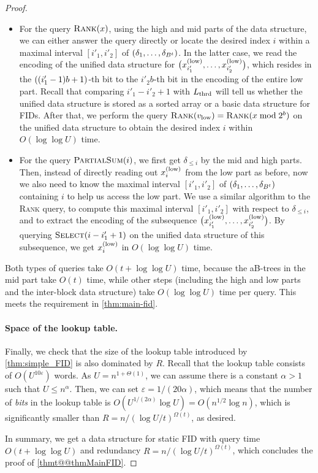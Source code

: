 \documentclass{article}
\theoremstyle{plain}
\theoremstyle{definition}  \newtheorem{definition}[theorem]{Definition}
\DeclarePairedDelimiter{\bk}{(}{)}
\newcommand{\eps}{\varepsilon}
\newcommand{\xlow}[1][i]{x_{#1}^{(\textup{low})}}
\newcommand{\rank}{\textup{\textsc{Rank}}\xspace}
\newcommand{\select}{\textup{\textsc{Select}}\xspace}
\newcommand{\partialsum}{\textup{\textsc{PartialSum}}\xspace}
\newcommand{\Lthrd}{L_{\textup{thrd}}}
\newcommand{\vlow}{v_{\textup{low}}}
\begin{document}
\begin{proof}
\begin{itemize}
\item For the query $\rank(x)$, using the high and mid parts of the data structure, we can either answer the query directly or locate the desired index $i$ within a maximal interval $[i'_1, i'_2]$ of $\bk{\delta_1, \ldots, \delta_{B^t}}$. In the latter case, we read the encoding of the unified data structure for $\bk[\big]{\xlow[i'_1], \ldots, \xlow[i'_2]}$, which resides in the $\bk{(i'_1 -1)b+1}$-th bit to the $i'_2 b$-th bit in the encoding of the entire low part.
  Recall that comparing $i'_1 - i'_2 + 1$ with $\Lthrd$ will tell us whether the unified data structure is stored as a sorted array or a basic data structure for FIDs.
  After that, we perform the query $\rank(\vlow) = \rank(x \bmod 2^b)$ on the unified data structure to obtain the desired index $i$ within $O(\log \log U)$ time.
\item For the query $\partialsum(i)$, we first get $\delta_{\le i}$ by the mid and high parts. Then, instead of directly reading out $\xlow$ from the low part as before, now we also need to know the maximal interval $[i'_1, i'_2]$ of $\bk{\delta_1, \ldots, \delta_{B^t}}$ containing $i$ to help us access the low part. We use a similar algorithm to the \rank query, to compute this maximal interval $[i'_1, i'_2]$ with respect to $\delta_{\le i}$, and to extract the encoding of the subsequence $\bk[\big]{\xlow[i'_1], \ldots, \xlow[i'_2]}$. By querying $\select(i - i'_1 + 1)$ on the unified data structure of this subsequence, we get $\xlow$ in $O(\log \log U)$ time.
\end{itemize}
Both types of queries take $O(t + \log \log U)$ time, because the aB-trees in the mid part take $O(t)$ time, while other steps (including the high and low parts and the inter-block data structure) take $O(\log \log U)$ time per query. This meets the requirement in \cref{thm:main-fid}.

\paragraph*{Space of the lookup table.}
Finally, we check that the size of the lookup table introduced by \cref{thm:simple_FID} is also dominated by $R$. Recall that the lookup table consists of $O(U^{10\eps})$ words. As $U = n^{1+ \Theta(1)}$, we can assume there is a constant $\alpha > 1$ such that $U \le n^{\alpha}$. Then, we can set $\eps = 1/(20\alpha)$, which means that the number of \emph{bits} in the lookup table is $O(U^{1/(2 \alpha)} \log U) = O(n^{1/2} \log n)$, which is significantly smaller than $R = n/(\log U/t)^{\Omega(t)}$, as desired.

In summary, we get a data structure for static FID with query time $O(t + \log \log U)$ and redundancy $R = n/(\log U/t)^{\Omega(t)}$, which concludes the proof of \cref{thmt@@thmMainFID}.
\end{proof}
 
\end{document}
